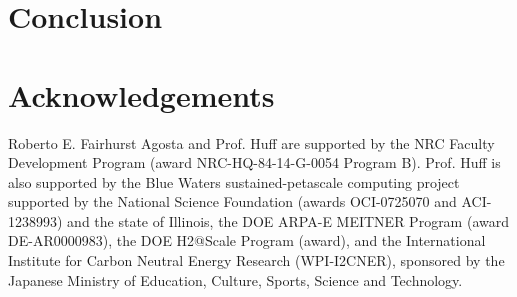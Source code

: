 \documentclass{anstrans}
\begin{document}
\section{Conclusion}



\section{Acknowledgements}

Roberto E. Fairhurst Agosta and Prof. Huff are supported by the \gls{NRC} Faculty Development Program (award NRC-HQ-84-14-G-0054 Program B). Prof. Huff is also supported by the Blue Waters sustained-petascale computing project supported by the National Science Foundation (awards OCI-0725070 and ACI-1238993) and the state of Illinois, the DOE ARPA-E MEITNER Program (award DE-AR0000983), the DOE H2@Scale Program (award), and the International Institute for Carbon Neutral Energy Research (WPI-I2CNER), sponsored by the Japanese Ministry of Education, Culture, Sports, Science and Technology.



\end{document}

